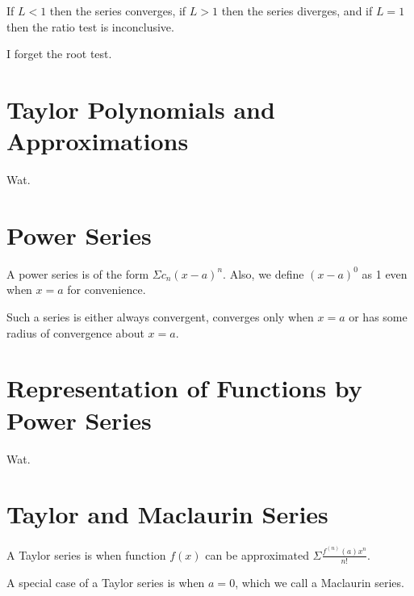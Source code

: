 \documentclass{article}
\begin{document}
If $L<1$ then the series converges, if $L>1$ then the series diverges,
and if $L=1$ then the ratio test is inconclusive.

I forget the root test.

\section{Taylor Polynomials and Approximations}

Wat.

\section{Power Series}

A power series is of the form $\Sigma c_n(x-a)^n$.  Also, we define $(x-a)^0$ as 1 even when $x=a$ for convenience.

Such a series is either always convergent, converges only when $x=a$ or has some radius of convergence about $x=a$.

\section{Representation of Functions by Power Series}

Wat.

\section{Taylor and Maclaurin Series}

A Taylor series is when function $f(x)$ can be approximated $\Sigma \frac{f^{(n)}(a)x^n}{n!}$.

A special case of a Taylor series is when $a=0$, which we call a Maclaurin series.
\end{document}
